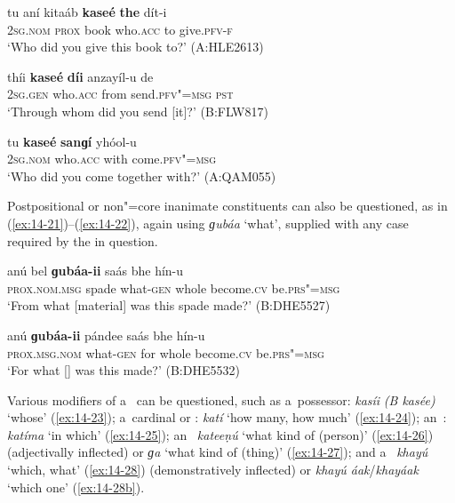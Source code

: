 \begin{exe}
\ex
\label{ex:14-18}
\gll tu aní kitaáb \textbf{kaseé} \textbf{the} dít-i \\
\textsc{2sg.nom} \textsc{prox} book who.\textsc{acc} to give.\textsc{pfv-f} \\
\glt `Who did you give this book to?' (A:HLE2613)

\ex
\label{ex:14-19}
\gll thíi \textbf{kaseé} \textbf{díi} anzayíl-u de \\
\textsc{2sg.gen} who.\textsc{acc} from send.\textsc{pfv"=msg} \textsc{pst} \\
\glt `Through whom did you send [it]?' (B:FLW817)

\ex
\label{ex:14-20}
\gll tu \textbf{kaseé} \textbf{sanɡí} yhóol-u \\
\textsc{2sg.nom} who.\textsc{acc} with come.\textsc{pfv"=msg} \\
\glt `Who did you come together with?' (A:QAM055)
\end{exe}

Postpositional or non"=core inanimate constituents can also be questioned, as in (\ref{ex:14-21})--(\ref{ex:14-22}), again using \textit{ɡubáa} `what', supplied with any case  required by the  in question.

\begin{exe}
\ex
\label{ex:14-21}
\gll anú bel \textbf{ɡubáa-ii} saás bhe hín-u  \\
\textsc{prox.nom.msg} spade what-\textsc{gen} whole become.\textsc{cv}  be.\textsc{prs"=msg} \\
\glt `From what [material] was this spade made?' (B:DHE5527)

\ex
\label{ex:14-22}
\gll anú \textbf{ɡubáa-ii} pándee saás bhe  hín-u \\
\textsc{prox.msg.nom} what-\textsc{gen} for whole become.\textsc{cv}  be.\textsc{prs"=msg} \\
\glt `For what [] was this made?' (B:DHE5532)
\end{exe}

 Various modifiers of a~ can be questioned,
such as a~possessor: \textit{kasíi} \textit{(B kasée)} `whose' (\ref{ex:14-23});
a~cardinal  or : \textit{katí} `how many, how much' (\ref{ex:14-24});
an~: \textit{katíma} `in which' (\ref{ex:14-25}); an~
\textit{kateeṇú} `what kind of (person)' (\ref{ex:14-26}) (adjectivally inflected) or
\textit{ɡa} `what kind of (thing)' (\ref{ex:14-27}); and a~ \textit{khayú} `which,
what' (\ref{ex:14-28}) (demonstratively inflected) or \textit{khayú áak}/\textit{khayáak} `which one' (\ref{ex:14-28b}).

